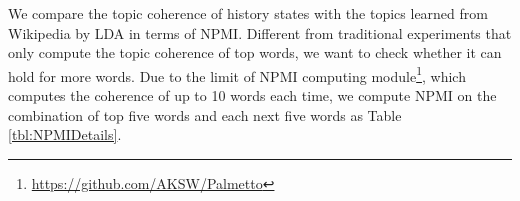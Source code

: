 \documentclass{article}
\begin{document}
We compare the topic coherence of history states with the topics learned from Wikipedia by LDA in terms of NPMI\cite{Rder2015ExploringTS}.
Different from traditional experiments that only compute the topic coherence of top words, we want to check whether  it can hold for more words.
Due to the limit of NPMI computing module\footnote{\url{https://github.com/AKSW/Palmetto}}, which computes the coherence of up to 10 words each time, we compute NPMI on the combination of top five words and each next five words as Table \ref{tbl:NPMIDetails}.



\end{document}
